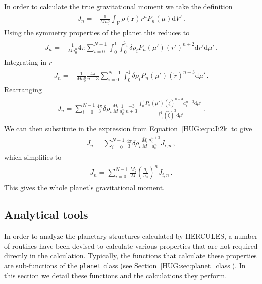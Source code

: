 \documentclass[11pt, oneside]{article}   	%
\renewcommand{\vec}[1]{\bm{#1}}
\begin{document}
In order to calculate the true gravitational moment we take the definition
%
\begin{align}
\begin{aligned}
J_{n}  = -\frac{1}{M a_0^{n}} \int_{\mathcal{V}} \rho(\vec{r}) r^n P_n(\mu) \mathrm{d}V' \,.
\end{aligned}
\end{align}
%
Using the symmetry properties of the planet this reduces to
%
\begin{align}
\begin{aligned}
J_{n}  = -\frac{1}{M a_0^{n}} 4 \pi  \sum_{i=0}^{N-1} \int_0^1 \int_0^{\tilde{r}_i} \delta \rho_i P_n(\mu') (r')^{n+2}  \mathrm{d}r' \mathrm{d}\mu' \,.
\end{aligned}
\end{align}
%
Integrating in $r$ 
%
\begin{align}
\begin{aligned}
J_{n}  = -\frac{1}{M a_0^{n}} \frac{4 \pi}{n+3}  \sum_{i=0}^{N-1} \int_0^1 \delta \rho_i P_n(\mu') (\tilde{r})^{n+3}  \mathrm{d}\mu' \,.
\end{aligned}
\end{align}
%
Rearranging
%
\begin{align}
\begin{aligned}
J_{n}  = \sum_{i=0}^{N-1} \frac{4 \pi}{3} \delta \rho_i \frac{\bar{M}_i}{M}  \frac{1}{a_0^n}  \frac{-3}{n+3} \frac{\int_0^1 P_n(\mu') (\tilde{\xi})^{n+3}  a_i^{n+3} \mathrm{d}\mu'} {\int_0^1 (\tilde{\xi})^{3}  \mathrm{d}\mu'} \,.
\end{aligned}
\end{align}
%
We can then substitute in the expression from Equation~\ref{HUG:eqn:Ji2k} to give
%
\begin{align}
\begin{aligned}
J_{n}  = \sum_{i=0}^{N-1} \frac{4 \pi}{3} \delta \rho_i \frac{\bar{M}_i}{M}  \frac{a_i^{n+3}}{a_0^n} J_{i,n} \,,
\end{aligned}
\end{align}
%
which simplifies to
%
\begin{align}
\begin{aligned}
J_{n}  = \sum_{i=0}^{N-1} \frac{M_i}{M} \left ( \frac{a_i}{a_0} \right )^{n} J_{i,n} \,.
\end{aligned}
\end{align}
%
This gives the whole planet's gravitational moment.

\subsection{Analytical tools}
In order to analyze the planetary structures calculated by HERCULES, a number of routines have been devised to calculate various properties that are not required directly in the calculation. Typically, the functions that calculate these properties are sub-functions of the \texttt{planet} class (see Section~\ref{HUG:sec:planet_class}). 
In this section we detail these functions and the calculations they perform.
\end{document}
